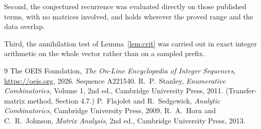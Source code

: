 \documentclass[11pt,a4paper]{article}
\theoremstyle{plain}
\theoremstyle{definition}
\begin{document}
Second, the conjectured recurrence was evaluated directly on those published terms, with no
matrices involved, and holds wherever the proved range and the data overlap.

Third, the annihilation test of Lemma~\ref{lem:crit} was carried out in exact integer
arithmetic on the whole vector rather than on a sampled prefix.

\begin{thebibliography}{9}
 The OEIS Foundation, \emph{The On-Line Encyclopedia of Integer
Sequences}, \url{https://oeis.org}, 2026. Sequence A221540.
 R.~P.~Stanley, \emph{Enumerative Combinatorics}, Volume 1, 2nd ed.,
Cambridge University Press, 2011. (Transfer-matrix method, Section 4.7.)
 P.~Flajolet and R.~Sedgewick, \emph{Analytic Combinatorics}, Cambridge
University Press, 2009.
 R.~A.~Horn and C.~R.~Johnson, \emph{Matrix Analysis}, 2nd ed., Cambridge
University Press, 2013.
\end{thebibliography}
\end{document}
